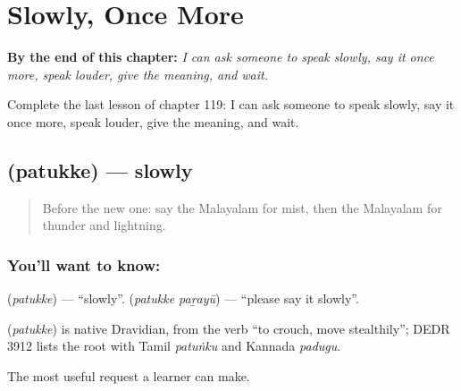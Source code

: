 
\chapter{Slowly, Once More}
\label{ch:ml-slowly-once-more}

\begin{chapteropening}
\textbf{By the end of this chapter:} \emph{I can ask someone to speak slowly, say it once more, speak louder, give the meaning, and wait.}

Complete the last lesson of chapter 119: I can ask someone to speak slowly, say it once more, speak louder, give the meaning, and wait.
\end{chapteropening}

\section[\texorpdfstring{\ml{പതുക്കെ} (patukke)}{പതുക്കെ (patukke)}]{ (patukke) — slowly}

\label{lesson:ML-C119-slowly}



\begin{quote}
Before the new one: say the Malayalam for mist, then the Malayalam for thunder and lightning.
\end{quote}

\subsection*{You'll want to know: }
\textbf{} (\emph{patukke}) — \textquotedblleft{}slowly\textquotedblright{}. \textbf{ } (\emph{patukke paṟayū}) — \textquotedblleft{}please say it slowly\textquotedblright{}.

\begin{cousinweb}
\textbf{} (\emph{patukke}) is native Dravidian, from the verb \textquotedblleft{}to crouch, move stealthily\textquotedblright{}; DEDR 3912 lists the root with Tamil \emph{patuṅku} and Kannada \emph{padugu}.
\end{cousinweb}

\begin{grammarlens}[title={What you've built}]
The most useful request a learner can make.
\end{grammarlens}

